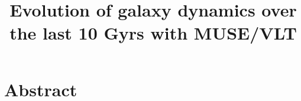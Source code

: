 \documentclass[a4paper, twoside, 12pt]{article}
\title{Evolution of galaxy dynamics over the last 10 Gyrs with MUSE/VLT}
\begin{document}


\clearpage
\thispagestyle{empty}
\section*{Abstract}



\clearpage
{}
\tableofcontents
\clearpage
\listoffigures
\clearpage
\listoftables
\clearpage











\clearpage
\renewcommand*{\thesection}{}\textbf{}

\def\bibfont{\small}





\appendix
\renewcommand*{\thesection}{\Alph{section}}\textbf{}


\end{document}
